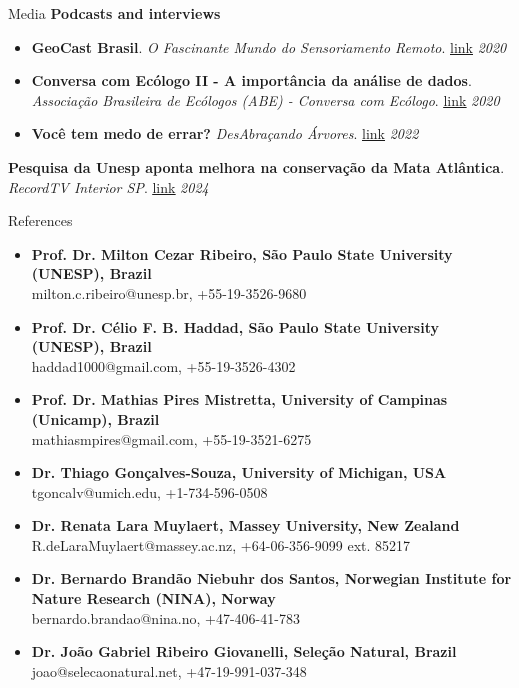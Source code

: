 \documentclass{resume}
\begin{document}
\begin{rSection}{Media}
{\bf Podcasts and interviews}
\begin{itemize} 
\item {\bf GeoCast Brasil}. {\it O Fascinante Mundo do Sensoriamento Remoto}. \href{https://open.spotify.com/episode/0Kn5k9039vM8bZgb4YdlJJ?si=S5hfhNc6S6GfDFaJSsaQDA}{\underline{link}} \hfill{\em 2020}
\item {\bf Conversa com Ecólogo II - A importância da análise de dados}. {\it Associação Brasileira de Ecólogos (ABE) - Conversa com Ecólogo}. \href{https://www.instagram.com/p/CFQVjMtH6qk/}{\underline{link}} \hfill{\em 2020}
\item {\bf Você tem medo de errar?} {\it DesAbraçando Árvores}. \href{https://www.desabrace.com.br/092-voce-tem-medo-de-errar/}{\underline{link}} \hfill{\em 2022} 
\end{itemize} 
\item {\bf Pesquisa da Unesp aponta melhora na conservação da Mata Atlântica}. {\it RecordTV Interior SP}. \href{https://recordtv.r7.com/recordtv-interior-sp/sp-record/pesquisa-da-unesp-aponta-melhora-na-conservacao-da-mata-atlantica-27032024?utm_source=link_direto&utm_medium=share-bar&utm_campaign=r7-topo}{\underline{link}} \hfill{\em 2024}
\end{rSection}


\begin{rSection}{References}
\begin{itemize}
\item {\bf Prof. Dr. Milton Cezar Ribeiro, São Paulo State University (UNESP), Brazil}\\
milton.c.ribeiro@unesp.br, +55-19-3526-9680
\item {\bf Prof. Dr. Célio F. B. Haddad, São Paulo State University (UNESP), Brazil}\\
haddad1000@gmail.com, +55-19-3526-4302
\item {\bf Prof. Dr. Mathias Pires Mistretta, University of Campinas (Unicamp), Brazil}\\
mathiasmpires@gmail.com, +55-19-3521-6275
\item {\bf Dr. Thiago Gonçalves-Souza, University of Michigan, USA}\\
tgoncalv@umich.edu, +1-734-596-0508
\item {\bf Dr. Renata Lara Muylaert, Massey University, New Zealand}\\
R.deLaraMuylaert@massey.ac.nz, +64-06-356-9099 ext. 85217
\item {\bf Dr. Bernardo Brandão Niebuhr dos Santos, Norwegian Institute for Nature Research (NINA), Norway}\\
bernardo.brandao@nina.no, +47-406-41-783
\item {\bf Dr. João Gabriel Ribeiro Giovanelli, Seleção Natural, Brazil}\\
joao@selecaonatural.net, +47-19-991-037-348
\end{itemize}
\end{rSection}
\end{document}
